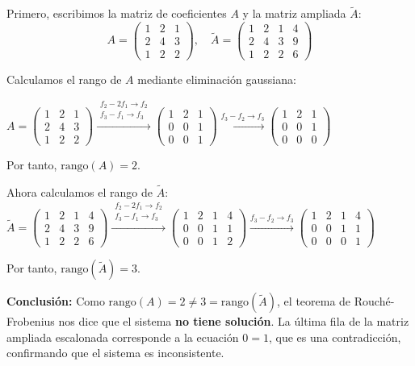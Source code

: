 \begin{myproof} Primero, escribimos la matriz de coeficientes $A$ y la matriz ampliada $\tilde{A}$:
$$A = \begin{pmatrix}
1 & 2 & 1\\
2 & 4 & 3\\
1 & 2 & 2
\end{pmatrix}, \quad \tilde{A} = \begin{pmatrix}
1 & 2 & 1 & 4\\
2 & 4 & 3 & 9\\
1 & 2 & 2 & 6
\end{pmatrix}$$

Calculamos el rango de $A$ mediante eliminación gaussiana:

$A = \begin{pmatrix}
1 & 2 & 1\\
2 & 4 & 3\\
1 & 2 & 2
\end{pmatrix} \xrightarrow{\begin{array}{c}f_2 - 2f_1 \to f_2\\ f_3 - f_1 \to f_3\end{array}} \begin{pmatrix}
1 & 2 & 1\\
0 & 0 & 1\\
0 & 0 & 1
\end{pmatrix} \xrightarrow{f_3 - f_2 \to f_3} \begin{pmatrix}
1 & 2 & 1\\
0 & 0 & 1\\
0 & 0 & 0
\end{pmatrix}$ 

Por tanto, $\text{rango}(A) = 2$.

Ahora calculamos el rango de $\tilde{A}$:
$\tilde{A} = \begin{pmatrix}
1 & 2 & 1 & 4\\
2 & 4 & 3 & 9\\
1 & 2 & 2 & 6
\end{pmatrix} \xrightarrow{\begin{array}{c}f_2 - 2f_1 \to f_2\\ f_3 - f_1 \to f_3\end{array}} \begin{pmatrix}
1 & 2 & 1 & 4\\
0 & 0 & 1 & 1\\
0 & 0 & 1 & 2
\end{pmatrix} \xrightarrow{f_3 - f_2 \to f_3} \begin{pmatrix}
1 & 2 & 1 & 4\\
0 & 0 & 1 & 1\\
0 & 0 & 0 & 1
\end{pmatrix}$

Por tanto, $\text{rango}(\tilde{A}) = 3$.

\textbf{Conclusión:} Como $\text{rango}(A) = 2 \neq 3 = \text{rango}(\tilde{A})$, el teorema de Rouché-Frobenius nos dice que el sistema \textbf{no tiene solución}. La última fila de la matriz ampliada escalonada corresponde a la ecuación $0 = 1$, que es una contradicción, confirmando que el sistema es inconsistente.
\end{myproof}

